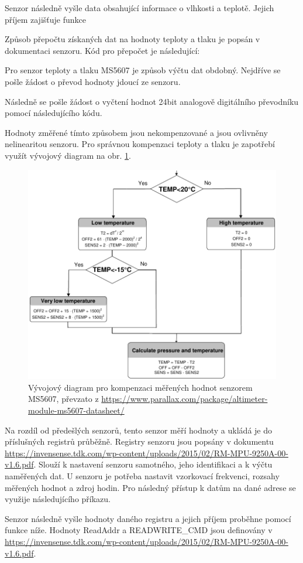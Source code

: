\documentclass[twoside]{ctuthesis}
\theoremstyle{plain}
\theoremstyle{definition}
\theoremstyle{note}
\begin{document}
	Senzor následně vyšle data obsahující informace o vlhkosti a teplotě. Jejich příjem zajišťuje funkce
	

	Způsob přepočtu získaných dat na hodnoty teploty a tlaku je popsán v dokumentaci senzoru. Kód pro přepočet je následující:
	

	Pro senzor teploty a tlaku MS5607 je způsob výčtu dat obdobný. Nejdříve se pošle žádost o převod hodnoty jdoucí ze senzoru.
	
	Následně se pošle žádost o vyčtení hodnot 24bit analogově digitálního převodníku pomocí následujícího kódu.
	

	Hodnoty změřené tímto způsobem jsou nekompenzované a jsou ovlivněny nelinearitou senzoru. Pro správnou kompenzaci teploty a tlaku je zapotřebí využít vývojový diagram na obr. \ref{fig:ms5607:flowchart}.
	\begin{figure}
		\centering
		\includegraphics[width=.7\textwidth]{Figures/MS5607_flowchart.pdf}
		\caption{Vývojový diagram pro kompenzaci měřených hodnot senzorem MS5607, převzato z \url{https://www.parallax.com/package/altimeter-module-ms5607-datasheet/}}
		\label{fig:ms5607:flowchart}
	\end{figure}

	Na rozdíl od předešlých senzorů, tento senzor měří hodnoty a ukládá je do příslušných registrů průběžně. Registry senzoru jsou popsány v dokumentu \url{https://invensense.tdk.com/wp-content/uploads/2015/02/RM-MPU-9250A-00-v1.6.pdf}. Slouží k nastavení senzoru samotného, jeho identifikaci a k výčtu naměřených dat. U senzoru je potřeba nastavit vzorkovací frekvenci, rozsahy měřených hodnot a zdroj hodin. Pro následný přístup k datům na dané adrese se využije následujícího příkazu.
	
	Senzor následně vyšle hodnoty daného registru a jejich příjem proběhne pomocí funkce níže. Hodnoty ReadAddr a READWRITE\_CMD jsou definovány v \url{https://invensense.tdk.com/wp-content/uploads/2015/02/RM-MPU-9250A-00-v1.6.pdf}.
	
	
\end{document}
